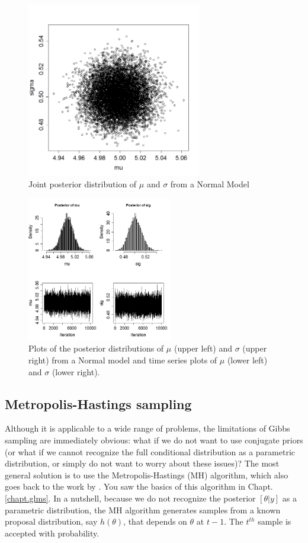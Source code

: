 \begin{figure}
\begin{center}
\includegraphics[height=3in]{Ch7/figs/postdist}
\end{center}
\caption{Joint posterior distribution of $\mu$ and $\sigma$ from a Normal Model}
\label{postdist.fig}
\end{figure}

\begin{figure}
\begin{center}
\includegraphics[width=2.5in]{Ch7/figs/plotsofPD}
\end{center}
\caption{
Plots of the posterior distributions of $\mu$ (upper left) and
  $\sigma$ (upper right)
  from a Normal model and time series plots of $\mu$ (lower left) and $\sigma$ (lower right).}
\label{plotsofPD.fig}
\end{figure}


\subsection{ Metropolis-Hastings sampling   }

Although it is applicable to a wide range of problems, the limitations
of Gibbs sampling are immediately obvious: what if we do not want to
use conjugate priors (or what if we cannot recognize the full
conditional distribution as a parametric distribution, or simply do
not want to worry about these issues)? The most general solution is to
use the Metropolis-Hastings (MH) algorithm, which also goes back to
the work by \citet{metropolis_ulam:1953}. You saw the basics of this
algorithm in Chapt. \ref{chapt.glms}. In a nutshell, because we do not recognize the
posterior $[\theta|y]$ as a parametric distribution, the MH algorithm
generates samples from a known proposal distribution, say $h(\theta)$,
that depends on $\theta$ at $t-1$. The $t^{th}$ sample is accepted with probability. 

